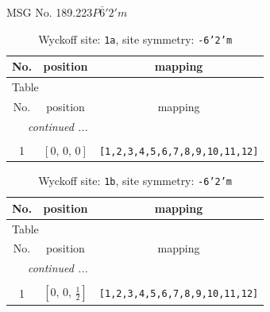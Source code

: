 \documentclass[fleqn,8pt]{jsarticle}
\begin{document}
\setcounter{MaxMatrixCols}{32}

\renewcommand{\tablename}{Table~}
\renewcommand{\figurename}{Figure~}
\begin{center}
\LARGE
MSG No. 189.223\quad$P\bar{6}'2'm$
\end{center}
\renewcommand{\arraystretch}{1.2}
\begin{longtable}{ccc}
\caption{Wyckoff site: {\tt 1a}, site symmetry: {\tt -6'2'm}}
 \\
 \hline \hline
No. & position & mapping \\ \hline \endfirsthead

\multicolumn{2}{l}{\tablename\ \thetable{}} \\
 \hline \hline
No. & position & mapping \\ \hline \endhead

 \hline \hline
\multicolumn{2}{r}{\footnotesize\it continued ...} \\ \endfoot

 \hline \hline
\multicolumn{2}{r}{} \\ \endlastfoot

1 & $\left[ 0,\, 0,\, 0 \right]$ & {\tt [1,2,3,4,5,6,7,8,9,10,11,12]} \\
\end{longtable}
\renewcommand{\arraystretch}{1.2}
\begin{longtable}{ccc}
\caption{Wyckoff site: {\tt 1b}, site symmetry: {\tt -6'2'm}}
 \\
 \hline \hline
No. & position & mapping \\ \hline \endfirsthead

\multicolumn{2}{l}{\tablename\ \thetable{}} \\
 \hline \hline
No. & position & mapping \\ \hline \endhead

 \hline \hline
\multicolumn{2}{r}{\footnotesize\it continued ...} \\ \endfoot

 \hline \hline
\multicolumn{2}{r}{} \\ \endlastfoot

1 & $\left[ 0,\, 0,\, \frac{1}{2} \right]$ & {\tt [1,2,3,4,5,6,7,8,9,10,11,12]} \\
\end{longtable}
\renewcommand{\arraystretch}{1.2}
\end{document}
